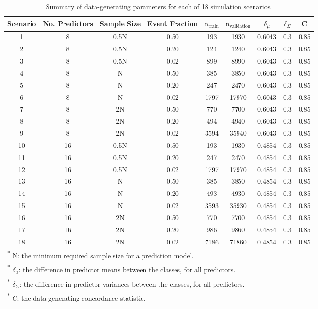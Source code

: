 \documentclass[AMA,STIX1COL,]{WileyNJD-v2}
\begin{document}
\begin{table}[!h]

\caption{\label{tab:sim_sets}Summary of data-generating parameters for each of 18 simulation scenarios.}
\centering
\begin{tabular}[t]{ccccccccc}
\toprule
Scenario & No. Predictors & Sample Size & Event Fraction & $\mathrm{n}_{\mathrm{train}}$ & $\mathrm{n}_{\mathrm{validation}}$ & $\delta_\mu$ & $\delta_\Sigma$ & C\\
\midrule
1 & 8 & 0.5N & 0.50 & 193 & 1930 & 0.6043 & 0.3 & 0.85\\
2 & 8 & 0.5N & 0.20 & 124 & 1240 & 0.6043 & 0.3 & 0.85\\
3 & 8 & 0.5N & 0.02 & 899 & 8990 & 0.6043 & 0.3 & 0.85\\
4 & 8 & N & 0.50 & 385 & 3850 & 0.6043 & 0.3 & 0.85\\
5 & 8 & N & 0.20 & 247 & 2470 & 0.6043 & 0.3 & 0.85\\
6 & 8 & N & 0.02 & 1797 & 17970 & 0.6043 & 0.3 & 0.85\\
7 & 8 & 2N & 0.50 & 770 & 7700 & 0.6043 & 0.3 & 0.85\\
8 & 8 & 2N & 0.20 & 494 & 4940 & 0.6043 & 0.3 & 0.85\\
9 & 8 & 2N & 0.02 & 3594 & 35940 & 0.6043 & 0.3 & 0.85\\
10 & 16 & 0.5N & 0.50 & 193 & 1930 & 0.4854 & 0.3 & 0.85\\
11 & 16 & 0.5N & 0.20 & 247 & 2470 & 0.4854 & 0.3 & 0.85\\
12 & 16 & 0.5N & 0.02 & 1797 & 17970 & 0.4854 & 0.3 & 0.85\\
13 & 16 & N & 0.50 & 385 & 3850 & 0.4854 & 0.3 & 0.85\\
14 & 16 & N & 0.20 & 493 & 4930 & 0.4854 & 0.3 & 0.85\\
15 & 16 & N & 0.02 & 3593 & 35930 & 0.4854 & 0.3 & 0.85\\
16 & 16 & 2N & 0.50 & 770 & 7700 & 0.4854 & 0.3 & 0.85\\
17 & 16 & 2N & 0.20 & 986 & 9860 & 0.4854 & 0.3 & 0.85\\
18 & 16 & 2N & 0.02 & 7186 & 71860 & 0.4854 & 0.3 & 0.85\\
\bottomrule
\multicolumn{9}{l}{\rule{0pt}{1em}\textsuperscript{*} N: the minimum required sample size for a prediction model.}\\
\multicolumn{9}{l}{\rule{0pt}{1em}\textsuperscript{*} $\delta_{\mu}$: the difference in predictor means between the classes, for all predictors.}\\
\multicolumn{9}{l}{\rule{0pt}{1em}\textsuperscript{*} $\delta_{\Sigma}$: the difference in predictor variances between the classes, for all predictors.}\\
\multicolumn{9}{l}{\rule{0pt}{1em}\textsuperscript{*} $C$: the data-generating concordance statistic.}\\
\end{tabular}
\end{table}
\end{document}

